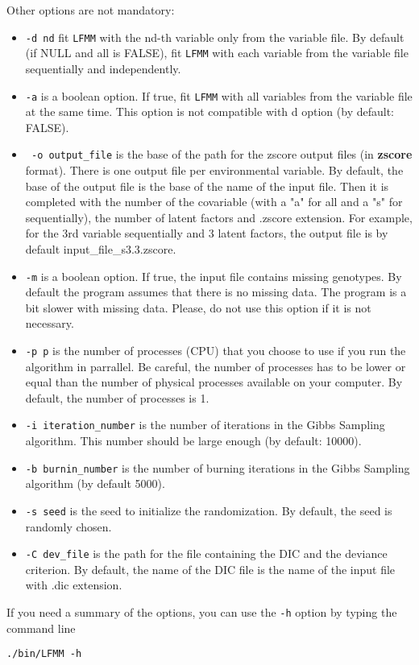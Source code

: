 \documentclass[10pt,a4paper]{article}
\begin{document}
\noindent
Other options are not mandatory:
\begin{itemize}
\item \verb|-d nd| fit {\tt LFMM} with the nd-th variable only from the variable file. By default (if NULL and all is FALSE), fit {\tt LFMM} with each variable from the variable file sequentially and independently.
\item \verb|-a| is a boolean option. If true, fit {\tt LFMM} with all variables from the variable file at the same time. This option is not compatible with d option (by default: FALSE).
\item \verb| -o output_file| is the base of the path for the zscore output files (in {\bf zscore} format). There is one output file per environmental variable. By default, the base of the output file is the base of the name of the input file. Then it is completed with the number of the covariable (with a "a" for all and a "s" for sequentially), the number of latent factors and .zscore extension. For example, for the 3rd variable sequentially and 3 latent factors, the output file is by default input\_file\_s3.3.zscore.
\item \verb|-m| is a boolean option. If true, the input file contains missing genotypes. By default the program assumes that there is no missing data. The program is a bit slower with missing data. Please, do not use this option if it is not necessary.
\item \verb|-p p| is the number of processes (CPU) that you choose to use if you run the algorithm in 
parrallel. Be careful, the number of processes has to be lower or equal than the number of physical 
processes available on your computer. By default, the number of processes is 1.
\item \verb|-i iteration_number| is the number of iterations in the Gibbs Sampling algorithm. This number
should be large enough (by default: 10000).
\item \verb|-b burnin_number| is the number of burning iterations in the Gibbs Sampling algorithm (by default 5000). 
\item \verb|-s seed| is the seed to initialize the randomization. By default, the seed is randomly chosen.
\item \verb|-C dev_file| is the path for the file containing the DIC and the deviance criterion. By default, the name of the DIC file is the name of the input file with .dic extension. 
\end{itemize}

\noindent
If you need a summary of the options, you can use the \verb|-h| option by typing the command line
\begin{Verbatim}[frame=single]
./bin/LFMM -h
\end{Verbatim}
\noindent
\end{document}
